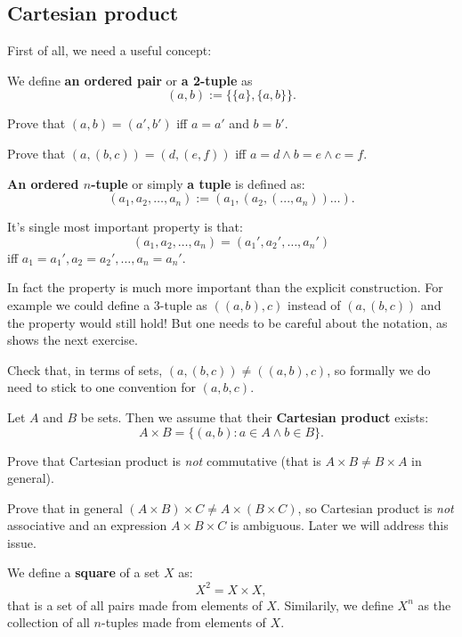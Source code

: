 \subsection{Cartesian product}
First of all, we need a useful concept:
\begin{definition}
  We define \textbf{an ordered pair} or \textbf{a 2-tuple} as
  $$(a,b) := \{\{a\}, \{a, b\}\}.$$
\end{definition}

\begin{prob}
  Prove that $(a,b)=(a',b')$ iff $a=a'$ and $b=b'$.
\end{prob}

\begin{prob}
  Prove that $(a,(b,c))=(d,(e,f))$ iff $a=d\wedge b=e\wedge c=f$.
\end{prob}

\begin{definition}
  \textbf{An ordered $n$-tuple} or simply \textbf{a tuple} is defined as:
  $$(a_1,a_2,\dots, a_n) := (a_1, (a_2, (..., a_n)) \dots ).$$

  It's single most important property is that:
  $$(a_1,a_2,\dots,a_n)=(a_1', a_2', \dots, a_n')$$ iff $a_1=a_1', a_2=a_2', \dots, a_n=a_n'.$
\end{definition}

In fact the property is much more important than the explicit construction. For example we could define a 3-tuple as $((a,b),c)$ instead of $(a, (b,c))$ and
the property would still hold! But one needs to be careful about the notation, as shows the next exercise.

\begin{exercise}
  Check that, in terms of sets, $(a,(b,c))\neq ((a,b),c)$, so formally we do need to stick to one convention for $(a,b,c)$.
\end{exercise}

\begin{definition}
  Let $A$ and $B$ be sets. Then we assume that their
  \textbf{Cartesian product} exists:
  $$A\times B = \{(a,b) : a\in A\wedge b\in B\}.$$
\end{definition}

\begin{exercise}
  Prove that Cartesian product is \textit{not} commutative (that is $A\times B\neq B\times A$ in general).
\end{exercise}

\begin{prob}
  Prove that in general $(A\times B)\times C\neq A\times (B\times C)$, so Cartesian product is \textit{not} associative and an expression $A\times B\times C$ is ambiguous.
  Later we will address this issue.
\end{prob}

\begin{definition}
  We define a \textbf{square} of a set $X$ as:
  $$X^2 = X\times X,$$
  that is a set of all pairs made from elements of $X$.
  Similarily, we define $X^n$ as the collection of all $n$-tuples made from elements of $X$.
\end{definition}
